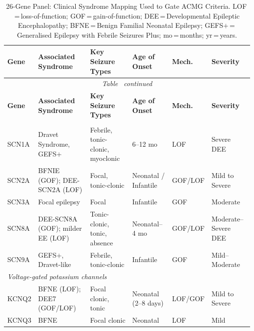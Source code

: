 \documentclass[12pt,a4paper]{article}
\begin{document}
\setlength{\tabcolsep}{3.5pt}
\scriptsize
\begin{longtable}{p{1.1cm}p{3.5cm}p{3.5cm}p{2.2cm}p{0.8cm}p{2.2cm}}
\caption{26-Gene Panel: Clinical Syndrome Mapping Used to Gate ACMG Criteria.
  LOF\,=\,loss-of-function; GOF\,=\,gain-of-function;
  DEE\,=\,Developmental Epileptic Encephalopathy;
  BFNE\,=\,Benign Familial Neonatal Epilepsy;
  GEFS$+$\,=\,Generalised Epilepsy with Febrile Seizures Plus;
  mo\,=\,months; yr\,=\,years.}
\label{tab:genepanel} \\
\toprule
\textbf{Gene} & \textbf{Associated Syndrome} & \textbf{Key Seizure Types} & \textbf{Age of Onset} & \textbf{Mech.} & \textbf{Severity} \\
\midrule
\endfirsthead
\multicolumn{6}{c}{\textit{Table~\thetable{} continued}} \\[2pt]
\toprule
\textbf{Gene} & \textbf{Associated Syndrome} & \textbf{Key Seizure Types} & \textbf{Age of Onset} & \textbf{Mech.} & \textbf{Severity} \\
\midrule
\endhead
\endfoot
\bottomrule
\endlastfoot
\multicolumn{6}{l}{\textit{Voltage-gated sodium channels}} \\
SCN1A   & Dravet Syndrome, GEFS$+$                    & Febrile, tonic-clonic, myoclonic        & 6--12 mo              & LOF     & Severe DEE \\
SCN2A   & BFNIE (GOF); DEE-SCN2A (LOF)                & Focal, tonic-clonic                     & Neonatal / Infantile  & GOF/LOF & Mild to Severe \\
SCN3A   & Focal epilepsy                              & Focal                                   & Infantile             & GOF     & Moderate \\
SCN8A   & DEE-SCN8A (GOF); milder EE (LOF)            & Tonic-clonic, tonic, absence            & Neonatal--4 mo        & GOF/LOF & Moderate--Severe DEE \\
SCN9A   & GEFS$+$, Dravet-like                        & Febrile, tonic-clonic                   & Infantile             & GOF     & Mild--Moderate \\
\midrule
\multicolumn{6}{l}{\textit{Voltage-gated potassium channels}} \\
KCNQ2   & BFNE (LOF); DEE7 (GOF/LOF)                 & Focal clonic, tonic                     & Neonatal (2--8 days)  & LOF/GOF & Mild to Severe \\
KCNQ3   & BFNE                                        & Focal clonic                            & Neonatal              & LOF     & Mild \\

\end{longtable}
\end{document}
